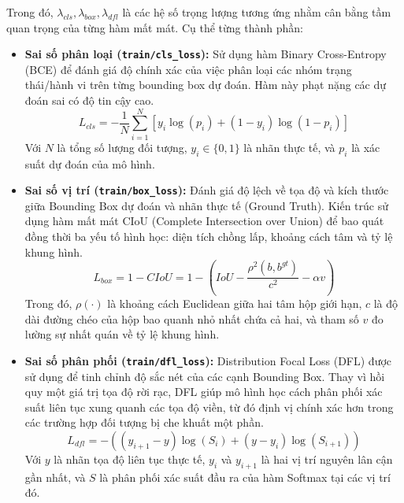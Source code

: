	Trong đó, $\lambda_{cls}, \lambda_{box}, \lambda_{dfl}$ là các hệ số trọng lượng tương ứng nhằm cân bằng tầm quan trọng của từng hàm mất mát. Cụ thể từng thành phần:
	
	\begin{itemize}
		\item \textbf{Sai số phân loại (\texttt{train/cls\_loss}):} Sử dụng hàm Binary Cross-Entropy (BCE) để đánh giá độ chính xác của việc phân loại các nhóm trạng thái/hành vi trên từng bounding box dự đoán. Hàm này phạt nặng các dự đoán sai có độ tin cậy cao.
		\begin{equation}
			L_{cls} = - \frac{1}{N} \sum_{i=1}^{N} \left[ y_i \log(p_i) + (1 - y_i) \log(1 - p_i) \right]
		\end{equation}
		Với $N$ là tổng số lượng đối tượng, $y_i \in \{0, 1\}$ là nhãn thực tế, và $p_i$ là xác suất dự đoán của mô hình.
		
		\item \textbf{Sai số vị trí (\texttt{train/box\_loss}):} Đánh giá độ lệch về tọa độ và kích thước giữa Bounding Box dự đoán và nhãn thực tế (Ground Truth). Kiến trúc sử dụng hàm mất mát CIoU (Complete Intersection over Union) để bao quát đồng thời ba yếu tố hình học: diện tích chồng lấp, khoảng cách tâm và tỷ lệ khung hình.
		\begin{equation}
			L_{box} = 1 - CIoU = 1 - \left( IoU - \frac{\rho^2(b, b^{gt})}{c^2} - \alpha v \right)
		\end{equation}
		Trong đó, $\rho(\cdot)$ là khoảng cách Euclidean giữa hai tâm hộp giới hạn, $c$ là độ dài đường chéo của hộp bao quanh nhỏ nhất chứa cả hai, và tham số $v$ đo lường sự nhất quán về tỷ lệ khung hình.
		
		\item \textbf{Sai số phân phối (\texttt{train/dfl\_loss}):} Distribution Focal Loss (DFL) được sử dụng để tinh chỉnh độ sắc nét của các cạnh Bounding Box. Thay vì hồi quy một giá trị tọa độ rời rạc, DFL giúp mô hình học cách phân phối xác suất liên tục xung quanh các tọa độ viền, từ đó định vị chính xác hơn trong các trường hợp đối tượng bị che khuất một phần.
		\begin{equation}
			L_{dfl} = - \left( (y_{i+1} - y) \log(S_i) + (y - y_i) \log(S_{i+1}) \right)
		\end{equation}
		Với $y$ là nhãn tọa độ liên tục thực tế, $y_i$ và $y_{i+1}$ là hai vị trí nguyên lân cận gần nhất, và $S$ là phân phối xác suất đầu ra của hàm Softmax tại các vị trí đó.
	\end{itemize}
	
